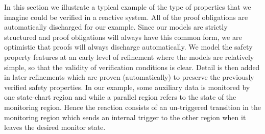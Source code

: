 In this section we illustrate a typical example of the type of properties that we imagine could be verified in a reactive \SCXML system.
All of the proof obligations are automatically discharged for our example.
Since our models are strictly structured and proof obligations will always have this common form, we are optimistic that proofs will always discharge automatically.
We model the safety property features at an early level of refinement where the models are relatively simple, so that the validity of verification conditions is clear. 
Detail is then added in later refinements which are proven (automatically) to preserve the previously verified safety properties.
In our example, some auxiliary data is monitored by one state-chart region and while a parallel region refers to the state of the monitoring region. 
Hence the reaction consists of an un-triggered transition in the monitoring region which sends an internal trigger to the other region when it leaves the desired monitor state.


